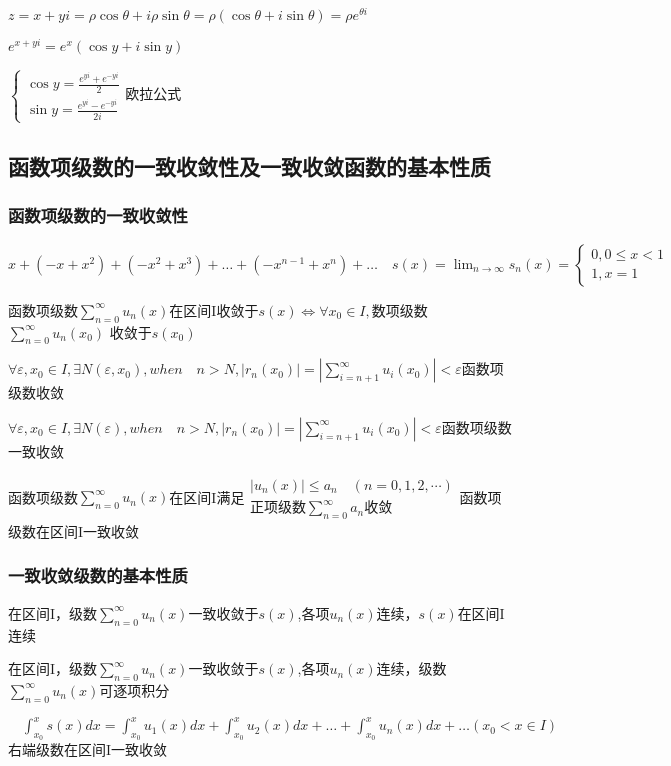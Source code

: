 \documentclass[UTF8]{ctexart}
\newcommand{\mt}[1]{\text{#1}}
\newcommand{\mf}[1]{\left( #1\right)}
\newcommand{\mfa}[1]{\left| #1\right|}
\newcommand{\q}{\quad}
\newcommand{\ma}[1]{\begin{array}{llll} #1 \end{array}}
\newcommand{\fcz}[1] {
    \left\{
        \begin{array}{llll} #1 \end{array}
    \right.
}
\newcommand{\jisu}[1]{\sum_{n=0}^\infty #1}
\newcommand{\jixian}[1]{\lim_{n \rightarrow \infty} #1}
\begin{document}
$z=x+yi=\rho \cos \theta + i\rho \sin \theta =\rho \mf{\cos \theta +i \sin \theta } =\rho e^{\theta i}$

$e^{x+yi}=e^x\mf{\cos y + i \sin y}$

$\fcz{
    \cos y=\frac{e^{yi}+e^{-yi}}{2}\\
    \sin y=\frac{e^{yi}-e^{-yi}}{2i}
}$欧拉公式


\subsection{函数项级数的一致收敛性及一致收敛函数的基本性质}


\subsubsection{函数项级数的一致收敛性}

$x +\mf{-x+x^2} +\mf{-x^2+x^3}+\dots+\mf{-x^{n-1}+x^n}+\dots \q s\mf{x}=\jixian{s_n\mf{x}}=\fcz{0,0\leqslant x<1\\1,x=1}$ 



函数项级数$\jisu{u_n\mf{x}}$在区间I收敛于$s\mf{x} \Leftrightarrow \forall x_0 \in I,$数项级数$\jisu{u_n\mf{x_0}}$ 收敛于$s\mf{x_0}$

$\forall \varepsilon,x_0 \in I,\exists N\mf{\varepsilon,x_0},when \q n>N,\mfa{r_n\mf{x_0}}=\mfa{\sum_{i=n+1}^\infty u_i\mf{x_0}}<\varepsilon$函数项级数收敛

$\forall \varepsilon,x_0 \in I,\exists N\mf{\varepsilon },when \q n>N,\mfa{r_n\mf{x_0}}=\mfa{\sum_{i=n+1}^\infty u_i\mf{x_0}}<\varepsilon$函数项级数一致收敛


函数项级数$\jisu{u_n\mf{x}}$在区间I满足$\ma{\mfa{u_n\mf{x}}\leqslant a_n \q \mf{n=0,1,2,\cdots}\\ \mt{正项级数} \jisu{a_n} \mt{收敛}}$函数项级数在区间I一致收敛


\subsubsection{一致收敛级数的基本性质}

在区间I，级数$\jisu{u_n\mf{x}}$一致收敛于$s\mf{x}$,各项$u_n\mf{x}$连续，$s\mf{x}$在区间I连续

在区间I，级数$\jisu{u_n\mf{x}}$一致收敛于$s\mf{x}$,各项$u_n\mf{x}$连续，级数$\jisu{u_n\mf{x}}$可逐项积分

$\q \int_{x_0}^xs\mf{x}dx=\int_{x_0}^xu_1\mf{x}dx+\int_{x_0}^xu_2\mf{x}dx+\dots+\int_{x_0}^xu_n\mf{x}dx+\dots\mf{x_0<x \in I}$ 右端级数在区间I一致收敛
\end{document}
